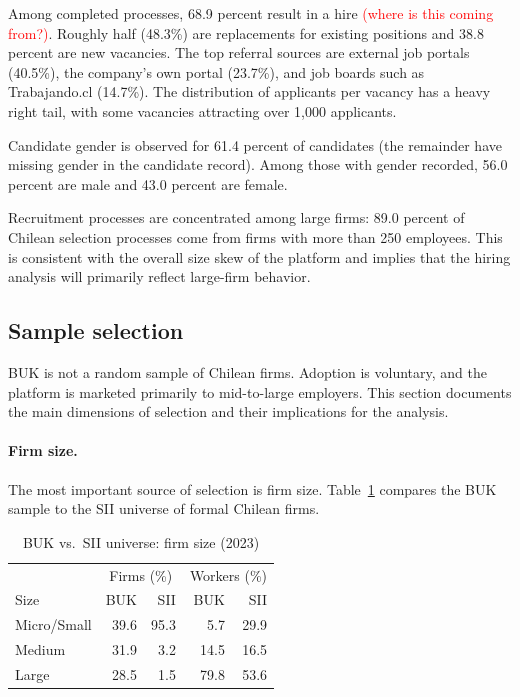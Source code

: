 \documentclass[11pt]{article}
\begin{document}
Among completed processes, 68.9 percent result in a hire \textcolor{red}{(where is this coming from?)}. Roughly half (48.3\%) are replacements for existing positions and 38.8 percent are new vacancies. The top referral sources are external job portals (40.5\%), the company's own portal (23.7\%), and job boards such as Trabajando.cl (14.7\%). The distribution of applicants per vacancy has a heavy right tail, with some vacancies attracting over 1,000 applicants.

Candidate gender is observed for 61.4 percent of candidates (the remainder have missing gender in the candidate record). Among those with gender recorded, 56.0 percent are male and 43.0 percent are female. %

Recruitment processes are concentrated among large firms: 89.0 percent of Chilean selection processes come from firms with more than 250 employees. This is consistent with the overall size skew of the platform and implies that the hiring analysis will primarily reflect large-firm behavior.

\subsection{Sample selection}
\label{sec:selection}

BUK is not a random sample of Chilean firms. Adoption is voluntary, and the platform is marketed primarily to mid-to-large employers. This section documents the main dimensions of selection and their implications for the analysis.

\paragraph{Firm size.} The most important source of selection is firm size. Table~\ref{tab:selection_size} compares the BUK sample to the SII universe of formal Chilean firms.

\begin{table}[h]
\centering
\caption{BUK vs.\ SII universe: firm size (2023)}
\label{tab:selection_size}
\begin{tabular}{lrrrr}
\hline
 & \multicolumn{2}{c}{Firms (\%)} & \multicolumn{2}{c}{Workers (\%)} \\
Size & BUK & SII & BUK & SII \\
\hline
Micro/Small  & 39.6 & 95.3 & 5.7  & 29.9 \\
Medium       & 31.9 &  3.2 & 14.5 & 16.5 \\
Large        & 28.5 &  1.5 & 79.8 & 53.6 \\
\hline
\end{tabular}
\end{table}
\end{document}
